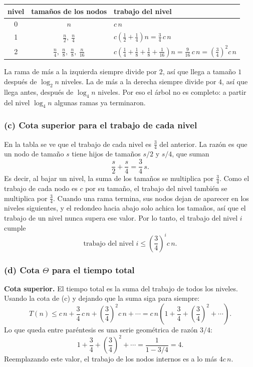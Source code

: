 \begin{center}
\begin{tabular}{ccl}
  \toprule
  nivel & tamaños de los nodos & trabajo del nivel \\
  \midrule
  0 & $n$ & $c\,n$ \\[2pt]
  1 & $\frac{n}{2},\ \frac{n}{4}$ & $c\left(\frac12 + \frac14\right) n = \frac34\, c\,n$ \\[4pt]
  2 & $\frac{n}{4},\ \frac{n}{8},\ \frac{n}{8},\ \frac{n}{16}$
    & $c\left(\frac14 + \frac18 + \frac18 + \frac1{16}\right) n = \frac{9}{16}\, c\,n
       = \left(\frac34\right)^2 c\,n$ \\
  \bottomrule
\end{tabular}
\end{center}

La rama de más a la izquierda siempre divide por $2$, así que llega a tamaño $1$ después
de $\log_2 n$ niveles. La de más a la derecha siempre divide por $4$, así que llega antes,
después de $\log_4 n$ niveles. Por eso el árbol no es completo: a partir del nivel
$\log_4 n$ algunas ramas ya terminaron.

\subsubsection*{(c) Cota superior para el trabajo de cada nivel}

En la tabla se ve que el trabajo de cada nivel es $\frac34$ del anterior. La razón es que
un nodo de tamaño $s$ tiene hijos de tamaños $s/2$ y $s/4$, que suman
\[
  \frac{s}{2} + \frac{s}{4} = \frac34\, s.
\]
Es decir, al bajar un nivel, la suma de los tamaños se multiplica por $\frac34$. Como el
trabajo de cada nodo es $c$ por su tamaño, el trabajo del nivel también se multiplica
por $\frac34$. Cuando una rama termina, sus nodos dejan de aparecer en los niveles
siguientes, y el redondeo hacia abajo solo achica los tamaños, así que el trabajo de un
nivel nunca supera ese valor. Por lo tanto, el trabajo del nivel $i$ cumple
\[
  \text{trabajo del nivel } i \le \left(\frac34\right)^{i} c\,n.
\]

\subsubsection*{(d) Cota $\Theta$ para el tiempo total}

\textbf{Cota superior.} El tiempo total es la suma del trabajo de todos los niveles.
Usando la cota de (c) y dejando que la suma siga para siempre:
\[
  T(n) \le c\,n + \frac34\, c\,n + \left(\frac34\right)^2 c\,n + \cdots
       = c\,n \left( 1 + \frac34 + \left(\frac34\right)^2 + \cdots \right).
\]
Lo que queda entre paréntesis es una serie geométrica de razón $3/4$:
\[
  1 + \frac34 + \left(\frac34\right)^2 + \cdots = \frac{1}{1 - 3/4} = 4.
\]
Reemplazando este valor, el trabajo de los nodos internos es a lo más $4c\,n$.

